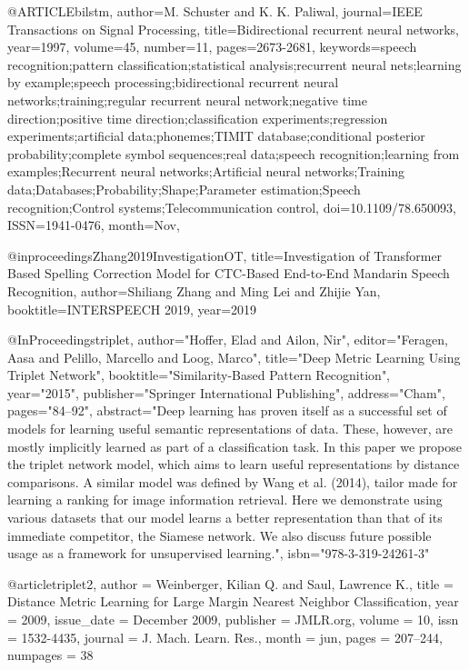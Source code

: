 @ARTICLE{bilstm,
author={M. {Schuster} and K. K. {Paliwal}},
journal={IEEE Transactions on Signal Processing},
title={Bidirectional recurrent neural networks},
year={1997},
volume={45},
number={11},
pages={2673-2681},
keywords={speech recognition;pattern classification;statistical analysis;recurrent neural nets;learning by example;speech processing;bidirectional recurrent neural networks;training;regular recurrent neural network;negative time direction;positive time direction;classification experiments;regression experiments;artificial data;phonemes;TIMIT database;conditional posterior probability;complete symbol sequences;real data;speech recognition;learning from examples;Recurrent neural networks;Artificial neural networks;Training data;Databases;Probability;Shape;Parameter estimation;Speech recognition;Control systems;Telecommunication control},
doi={10.1109/78.650093},
ISSN={1941-0476},
month={Nov},
}

@inproceedings{Zhang2019InvestigationOT,
  title={Investigation of Transformer Based Spelling Correction Model for CTC-Based End-to-End Mandarin Speech Recognition},
  author={Shiliang Zhang and Ming Lei and Zhijie Yan},
  booktitle={INTERSPEECH 2019},
  year={2019}
}


@InProceedings{triplet,
author="Hoffer, Elad
and Ailon, Nir",
editor="Feragen, Aasa
and Pelillo, Marcello
and Loog, Marco",
title="Deep Metric Learning Using Triplet Network",
booktitle="Similarity-Based Pattern Recognition",
year="2015",
publisher="Springer International Publishing",
address="Cham",
pages="84--92",
abstract="Deep learning has proven itself as a successful set of models for learning useful semantic representations of data. These, however, are mostly implicitly learned as part of a classification task. In this paper we propose the triplet network model, which aims to learn useful representations by distance comparisons. A similar model was defined by Wang et al. (2014), tailor made for learning a ranking for image information retrieval. Here we demonstrate using various datasets that our model learns a better representation than that of its immediate competitor, the Siamese network. We also discuss future possible usage as a framework for unsupervised learning.",
isbn="978-3-319-24261-3"
}

@article{triplet2,
author = {Weinberger, Kilian Q. and Saul, Lawrence K.},
title = {Distance Metric Learning for Large Margin Nearest Neighbor Classification},
year = {2009},
issue_date = {December 2009},
publisher = {JMLR.org},
volume = {10},
issn = {1532-4435},
journal = {J. Mach. Learn. Res.},
month = jun,
pages = {207–244},
numpages = {38}
}


